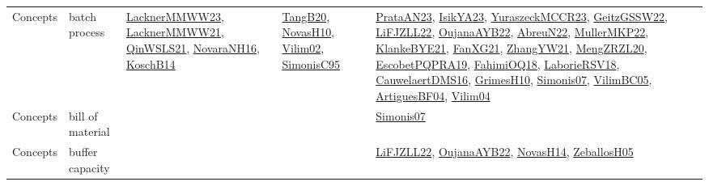 {\begin{longtable}{lp{3cm}>{\raggedright}p{6cm}>{\raggedright}p{6cm}p{8cm}}
Concepts & batch process & \href{articles/LacknerMMWW23.pdf}{LacknerMMWW23}\cite{LacknerMMWW23}, \href{papers/LacknerMMWW21.pdf}{LacknerMMWW21}\cite{LacknerMMWW21}, \href{articles/QinWSLS21.pdf}{QinWSLS21}\cite{QinWSLS21}, \href{articles/NovaraNH16.pdf}{NovaraNH16}\cite{NovaraNH16}, \href{papers/KoschB14.pdf}{KoschB14}\cite{KoschB14} & \href{papers/TangB20.pdf}{TangB20}\cite{TangB20}, \href{articles/NovasH10.pdf}{NovasH10}\cite{NovasH10}, \href{papers/Vilim02.pdf}{Vilim02}\cite{Vilim02}, \href{papers/SimonisC95.pdf}{SimonisC95}\cite{SimonisC95} & \href{articles/PrataAN23.pdf}{PrataAN23}\cite{PrataAN23}, \href{articles/IsikYA23.pdf}{IsikYA23}\cite{IsikYA23}, \href{articles/YuraszeckMCCR23.pdf}{YuraszeckMCCR23}\cite{YuraszeckMCCR23}, \href{papers/GeitzGSSW22.pdf}{GeitzGSSW22}\cite{GeitzGSSW22}, \href{papers/LiFJZLL22.pdf}{LiFJZLL22}\cite{LiFJZLL22}, \href{papers/OujanaAYB22.pdf}{OujanaAYB22}\cite{OujanaAYB22}, \href{articles/AbreuN22.pdf}{AbreuN22}\cite{AbreuN22}, \href{articles/MullerMKP22.pdf}{MullerMKP22}\cite{MullerMKP22}, \href{papers/KlankeBYE21.pdf}{KlankeBYE21}\cite{KlankeBYE21}, \href{articles/FanXG21.pdf}{FanXG21}\cite{FanXG21}, \href{articles/ZhangYW21.pdf}{ZhangYW21}\cite{ZhangYW21}, \href{articles/MengZRZL20.pdf}{MengZRZL20}\cite{MengZRZL20}, \href{articles/EscobetPQPRA19.pdf}{EscobetPQPRA19}\cite{EscobetPQPRA19}, \href{articles/FahimiOQ18.pdf}{FahimiOQ18}\cite{FahimiOQ18}, \href{articles/LaborieRSV18.pdf}{LaborieRSV18}\cite{LaborieRSV18}, \href{papers/CauwelaertDMS16.pdf}{CauwelaertDMS16}\cite{CauwelaertDMS16}, \href{papers/GrimesH10.pdf}{GrimesH10}\cite{GrimesH10}, \href{articles/Simonis07.pdf}{Simonis07}\cite{Simonis07}, \href{articles/VilimBC05.pdf}{VilimBC05}\cite{VilimBC05}, \href{papers/ArtiguesBF04.pdf}{ArtiguesBF04}\cite{ArtiguesBF04}, \href{papers/Vilim04.pdf}{Vilim04}\cite{Vilim04}\\
Concepts & bill of material &  &  & \href{articles/Simonis07.pdf}{Simonis07}\cite{Simonis07}\\
Concepts & buffer capacity &  &  & \href{papers/LiFJZLL22.pdf}{LiFJZLL22}\cite{LiFJZLL22}, \href{papers/OujanaAYB22.pdf}{OujanaAYB22}\cite{OujanaAYB22}, \href{articles/NovasH14.pdf}{NovasH14}\cite{NovasH14}, \href{articles/ZeballosH05.pdf}{ZeballosH05}\cite{ZeballosH05}\\

\end{longtable}}
